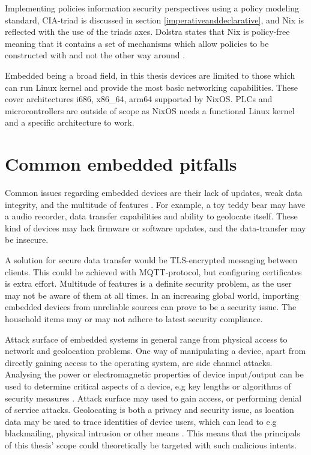 Implementing policies information security perspectives using a policy
modeling standard, CIA-triad is discussed in section
\ref{imperativeanddeclarative}, and Nix is reflected with the use of
the triads axes. Dolstra states that Nix is policy-free meaning that
it contains a set of mechanisms which allow policies to be constructed
with and not the other way around \cite{dolstra2004nix}.

Embedded being a broad field, in this thesis devices are limited to
those which can run Linux kernel and provide the most basic networking
capabilities. These cover architectures i686, x86\_64, arm64 supported
by NixOS. PLCs and microcontrollers are outside of scope as NixOS
needs a functional Linux kernel and a specific architecture to work.

\section{Common embedded pitfalls}

Common issues regarding embedded devices are their lack of updates,
weak data integrity, and the multitude of features
\cite{kemmerer2003cybersecurity, fysarakis2014embedded}. For example,
a toy teddy bear may have a audio recorder, data transfer capabilities
and ability to geolocate itself. These kind of devices may lack
firmware or software updates, and the data-transfer may be insecure.

A solution for secure data transfer would be TLS-encrypted messaging
between clients. This could be achieved with MQTT-protocol, but
configuring certificates is extra effort. Multitude of features is a
definite security problem, as the user may not be aware of them at all
times. In an increasing global world, importing embedded devices from
unreliable sources can prove to be a security issue. The household
items may or may not adhere to latest security
compliance. \cite{fysarakis2014embedded}

Attack surface of embedded systems in general range from physical
access to network and geolocation problems. One way of manipulating a
device, apart from directly gaining access to the operating system,
are side channel attacks. Analysing the power or electromagnetic
properties of device input/output can be used to determine critical
aspects of a device, e.g key lengths or algorithms of security
measures \cite{fysarakis2014embedded, serpanos2013security}. Attack
surface may used to gain access, or performing denial of service
attacks. Geolocating is both a privacy and security issue, as location
data may be used to trace identities of device users, which can lead
to e.g blackmailing, physical intrusion or other means
\cite{fysarakis2014embedded}. This means that the principals of this
thesis' scope could theoretically be targeted with such malicious
intents.

